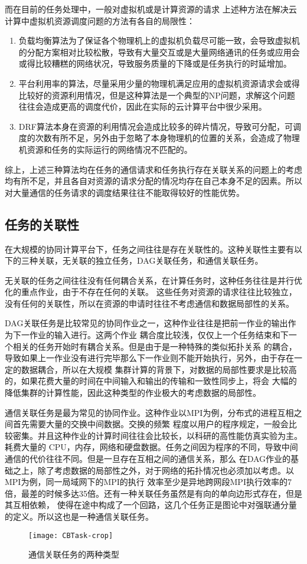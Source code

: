 而在目前的任务处理中，一般对虚拟机或是计算资源的请求
上述种方法在解决云计算中虚拟机资源调度问题的方法有各自的局限性：
\begin{enumerate}
\item 负载均衡算法为了保证各个物理机上的虚拟机负载尽可能一致，会导致虚拟机的分配方案相对比较松散，导致有大量交互或是大量网络通讯的任务或应用会或得比较糟糕的网络状况，导致服务质量的下降或是任务执行的时延增加。
\item 平台利用率的算法，尽量采用少量的物理机满足应用的虚拟机资源请求会或得比较好的资源利用情况，但是这种算法是一个典型的NP问题，求解这个问题往往会造成更高的调度代价，因此在实际的云计算平台中很少采用。
\item DRF算法本身在资源的利用情况会造成比较多的碎片情况，导致可分配，可调度的次数有所不足，另外由于忽略了本身物理机的位置的关系，会造成了物理机资源和任务的实际运行的网络情况不匹配的。
\end{enumerate}

综上，上述三种算法均在任务的通信请求和任务执行存在关联关系的问题上的考虑均有所不足，并且各自对资源的请求分配的情况均存在自己本身不足的因素。所以对大量通信的任务请求的调度结果往往不能取得较好的性能优势。

\subsection{任务的关联性}
在大规模的协同计算平台下，任务之间往往是存在关联性的。这种关联性主要有以下的三种关联，无关联的独立任务，DAG关联任务，和通信关联任务。

无关联的任务之间往往没有任何耦合关系，在计算任务时，这种任务往往是并行优化的重点作业，由于不存在任何的关联。
这些任务对资源的请求往往比较独立，没有任何的关联性，所以在资源的申请时往往不考虑通信和数据局部性的关系。

DAG关联任务是比较常见的协同作业之一，这种作业往往是把前一作业的输出作为下一作业的输入进行。这两个作业
耦合度比较浅，仅仅上一个任务结束和下一个相关的任务开始时有耦合关系。但是由于是一种特殊的类似拓扑关系
的耦合，导致如果上一作业没有进行完毕那么下一作业则不能开始执行，另外，由于存在一定的数据耦合，所以在大规模
集群计算的背景下，对数据的局部性要求是比较高的，如果花费大量的时间在中间输入和输出的传输和一致性同步上，将会
大幅的降低集群的计算性能，因此这种类型的作业极大的考虑数据的局部性。

通信关联任务是最为常见的协同作业。这种作业以MPI为例，分布式的进程互相之间首先需要大量的交换中间数据。交换的频繁
程度以用户的程序规定，一般会比较密集。并且这种作业的计算时间往往会比较长，以科研的高性能仿真实验为主。耗费大量的
CPU，内存，网络和硬盘数据。任务之间因为程序的不同，导致中间通信的代价往往不同。但是一旦存在互相之间的通信关系，那么
在DAG作业的基础之上，除了考虑数据的局部性之外，对于网络的拓扑情况也必须加以考虑。以MPI为例，同一局域网下的MPI的执行
效率至少是异地跨网段MPI执行效率的7倍，最差的时候多达35倍。还有一种关联任务虽然是有向的单向边形式存在，但是其互相依赖，
使得在途中构成了一个回路，这几个任务正是图论中对强联通分量的定义。所以这也是一种通信关联任务。
\begin{figure}[htbp]
\centering\texttt{[image: CBTask-crop]}
\caption{通信关联任务的两种类型}\label{fig:CBTask}
\end{figure}

